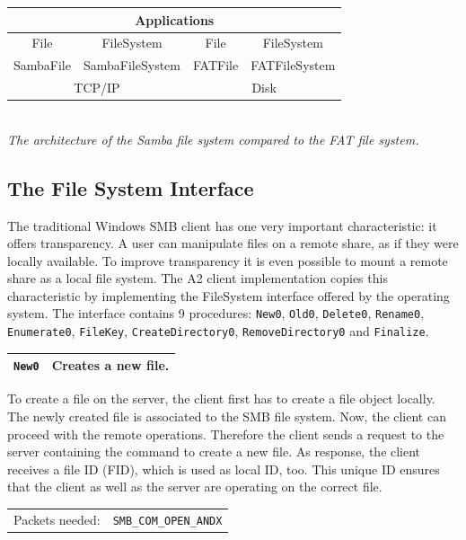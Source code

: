 \documentclass[11pt,a4paper]{book}
\begin{document}
\begin{center}
\begin{tabular}{|c||c||c||c|}
\hline
\multicolumn{4}{|c|}{Applications} \\
\hline
\hline
File & FileSystem & File & FileSystem \\
\hline 
\hline
SambaFile & SambaFileSystem & FATFile & FATFileSystem \\
\hline
\hline
\multicolumn{2}{|c||}{TCP/IP} & \multicolumn{2}{|c|}{Disk} \\
\hline
\end{tabular} \\
\vspace{6pt}
\textit{The architecture of the Samba file system compared to the FAT file system.}
\end{center}

\subsection{The File System Interface}
The traditional Windows SMB client has one very important characteristic: it offers transparency. A user can manipulate files on a remote share, as if they were locally available. To improve transparency it is even possible to mount a remote share as a local file system. The A2 client implementation copies this characteristic by implementing the FileSystem interface offered by the operating system. The interface contains 9 procedures: \texttt{New0}, \texttt{Old0}, \texttt{Delete0}, \texttt{Rename0}, \texttt{Enumerate0}, \texttt{FileKey}, \texttt{CreateDirectory0}, \texttt{RemoveDirectory0} and \texttt{Finalize}.

\begin{center}
\renewcommand{\tabcolsep}{5mm}
\begin{tabular}{p{3cm}p{8cm}}
\texttt{New0} & \textbf{Creates a new file.} \\ 
\hline
\end{tabular}
\end{center}
To create a file on the server, the client first has to create a file object locally. The newly created file is associated to the SMB file system. Now, the client can proceed with the remote operations. Therefore the client sends a request to the server containing the command to create a new file. As response, the client receives a file ID (FID), which is used as local ID, too. This unique ID ensures that the client as well as the server are operating on the correct file. \\
\renewcommand{\tabcolsep}{5mm}
\begin{tabular}{p{3cm}p{8cm}}
Packets needed: & \texttt{SMB\_COM\_OPEN\_ANDX} \\
\end{tabular}
\end{document}
